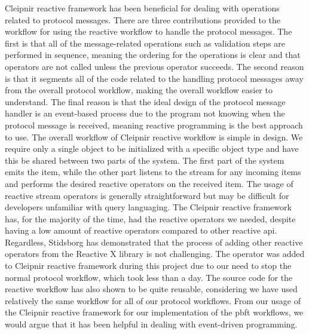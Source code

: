 Cleipnir reactive framework has been beneficial for dealing with operations related to protocol messages. There are three contributions provided to the workflow for using the reactive workflow to handle the protocol messages. The first is that all of the message-related operations such as validation steps are performed in sequence, meaning the ordering for the operations is clear and that operators are not called unless the previous operator succeeds. The second reason is that it segments all of the code related to the handling protocol messages away from the overall protocol workflow, making the overall workflow easier to understand.  The final reason is that the ideal design of the protocol message handler is an event-based process due to the program not knowing when the protocol message is received, meaning reactive programming is the best approach to use. 
The overall workflow of Cleipnir reactive workflow is simple in design. We require only a single  object to be initialized with a specific object type and have this be shared between two parts of the system. The first part of the system emits the item, while the other part listens to the stream for any incoming items and performs the desired reactive operators on the received item. The usage of reactive stream operators is generally straightforward but may be difficult for developers unfamiliar with query languaging. The Cleipnir reactive framework has, for the majority of the time, had the reactive operators we needed, despite having a low amount of reactive operators compared to other reactive \ac{api}. Regardless, Stidsborg has demonstrated that the process of adding other reactive operators from the Reactive X library is not challenging. The  operator was added to Cleipnir reactive framework during this project due to our need to stop the normal protocol workflow, which took less than a day. The source code for the reactive workflow has also shown to be quite reusable, considering we have used relatively the same workflow for all of our protocol workflows. From our usage of the Cleipnir reactive framework for our implementation of the \ac{pbft} workflows, we would argue that it has been helpful in dealing with event-driven programming. 

